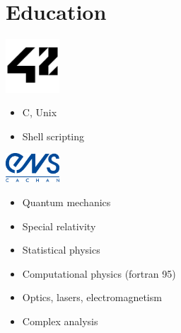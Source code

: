 \section{Education}

\noindent
\begin{minipage}{.15\textwidth}
\centerline{\includegraphics[width=20mm]{img/42}}
\end{minipage}%
\hspace{5mm}
\begin{minipage}{.7\textwidth}
\raggedright
    \begin{itemize}
        \item C, Unix
        \item Shell scripting
    \end{itemize}
\end{minipage}

\noindent
\begin{minipage}{.15\textwidth}
\centerline{\includegraphics[width=20mm]{img/ens}}
\end{minipage}%
\hspace{5mm}
\begin{minipage}{.7\textwidth}
\raggedright
    \begin{itemize}
        \item Quantum mechanics
        \item Special relativity
        \item Statistical physics
		\item Computational physics (fortran 95)
        \item Optics, lasers, electromagnetism
        \item Complex analysis
    \end{itemize}
\end{minipage}

